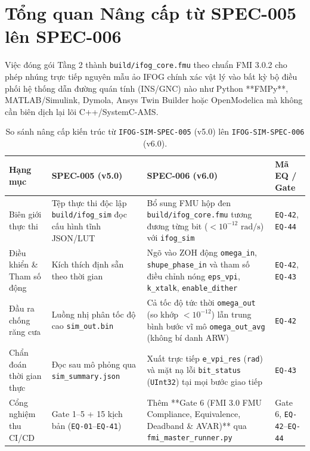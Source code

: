 \documentclass[11pt, a4paper]{article}
\begin{document}
\tableofcontents
\vspace{0.25cm}

\section{Tổng quan Nâng cấp từ SPEC-005 lên SPEC-006}

Việc đóng gói Tầng 2 thành \texttt{build/ifog\_core.fmu} theo chuẩn FMI 3.0.2 cho phép nhúng trực tiếp nguyên mẫu ảo IFOG chính xác vật lý vào bất kỳ bộ điều phối hệ thống dẫn đường quán tính (INS/GNC) nào như Python **FMPy**, MATLAB/Simulink, Dymola, Ansys Twin Builder hoặc OpenModelica mà không cần biên dịch lại lõi C++/SystemC-AMS.

\begin{table}[htbp]
\centering
\caption{So sánh nâng cấp kiến trúc từ \texttt{IFOG-SIM-SPEC-005} (v5.0) lên \texttt{IFOG-SIM-SPEC-006} (v6.0).}
\label{tab:spec006_diff}
\footnotesize
\renewcommand{\arraystretch}{1.2}
\begin{tabular}{@{}L{2.8cm} L{4.6cm} L{5.4cm} L{2.6cm}@{}}
\toprule
\textbf{Hạng mục} & \textbf{SPEC-005 (v5.0)} & \textbf{SPEC-006 (v6.0)} & \textbf{Mã EQ / Gate} \\
\midrule
Biên giới thực thi & Tệp thực thi độc lập \texttt{build/ifog\_sim} đọc cấu hình tĩnh JSON/LUT & Bổ sung FMU hộp đen \texttt{build/ifog\_core.fmu} tương đương từng bit ($<10^{-12}\text{ rad/s}$) với \texttt{ifog\_sim} & \texttt{EQ-42}, \texttt{EQ-44} \\
Điều khiển \& Tham số động & Kích thích định sẵn theo thời gian & Ngõ vào ZOH động \texttt{omega\_in}, \texttt{shupe\_phase\_in} và tham số điều chỉnh nóng \texttt{eps\_vpi}, \texttt{k\_xtalk}, \texttt{enable\_dither} & \texttt{EQ-42}, \texttt{EQ-43} \\
Đầu ra chống răng cưa & Luồng nhị phân tốc độ cao \texttt{sim\_out.bin} & Cả tốc độ tức thời \texttt{omega\_out} (so khớp $<10^{-12}$) lẫn trung bình bước vĩ mô \texttt{omega\_out\_avg} (không bí danh ARW) & \texttt{EQ-42} \\
Chẩn đoán thời gian thực & Đọc sau mô phỏng qua \texttt{sim\_summary.json} & Xuất trực tiếp \texttt{e\_vpi\_res} (\texttt{rad}) và mặt nạ lỗi \texttt{bit\_status} (\texttt{UInt32}) tại mọi bước giao tiếp & \texttt{EQ-43} \\
Cổng nghiệm thu CI/CD & Gate 1--5 + 15 kịch bản (\texttt{EQ-01}--\texttt{EQ-41}) & Thêm **Gate 6 (FMI 3.0 FMU Compliance, Equivalence, Deadband \& AVAR)** qua \texttt{fmi\_master\_runner.py} & Gate 6, \texttt{EQ-42}--\texttt{EQ-44} \\
\bottomrule
\end{tabular}
\end{table}
\end{document}
